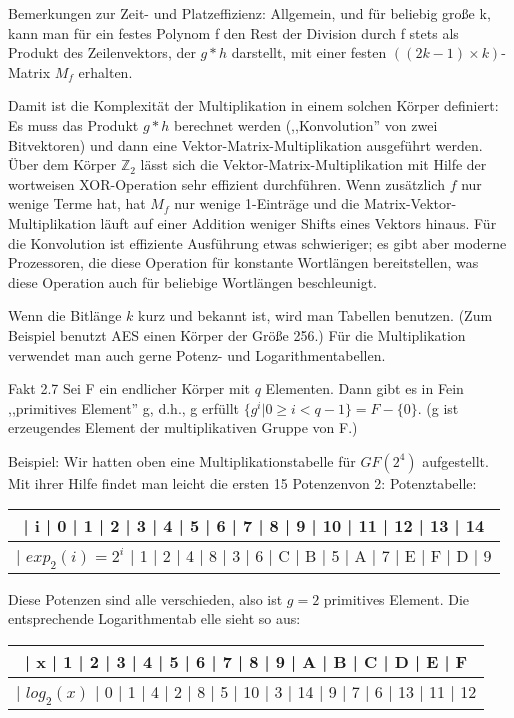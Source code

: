 \documentclass[a4paper]{article}
\begin{document}
\begin{multicols}{3}
    Bemerkungen zur Zeit- und Platzeffizienz: Allgemein, und für beliebig große k, kann man für ein festes Polynom f den Rest der Division durch f stets als Produkt des Zeilenvektors, der $g*h$ darstellt, mit einer festen $((2k-1)\times k)$-Matrix $M_f$ erhalten.

    Damit ist die Komplexität der Multiplikation in einem solchen Körper definiert: Es muss das Produkt $g*h$ berechnet werden (,,Konvolution'' von zwei Bitvektoren) und dann eine Vektor-Matrix-Multiplikation ausgeführt werden. Über dem Körper $\mathbb{Z}_2$ lässt sich die Vektor-Matrix-Multiplikation mit Hilfe der wortweisen XOR-Operation sehr effizient durchführen. Wenn zusätzlich $f$ nur wenige Terme hat, hat $M_f$ nur wenige 1-Einträge und die Matrix-Vektor-Multiplikation läuft auf einer Addition weniger Shifts eines Vektors hinaus. Für die Konvolution ist effiziente Ausführung etwas schwieriger; es gibt aber moderne Prozessoren, die diese Operation für konstante Wortlängen bereitstellen, was diese Operation auch für beliebige Wortlängen beschleunigt.

    Wenn die Bitlänge $k$ kurz und bekannt ist, wird man Tabellen benutzen. (Zum Beispiel benutzt AES einen Körper der Größe 256.) Für die Multiplikation verwendet man auch gerne Potenz- und Logarithmentabellen.

    Fakt 2.7 Sei F ein endlicher Körper mit $q$ Elementen. Dann gibt es in Fein ,,primitives Element'' g, d.h., g erfüllt $\{g^i| 0 \geq i < q-1\}=F-\{0\}$. (g ist erzeugendes Element der multiplikativen Gruppe von F.)

    Beispiel: Wir hatten oben eine Multiplikationstabelle für $GF(2^4)$ aufgestellt. Mit ihrer Hilfe findet man leicht die ersten 15 Potenzenvon 2:
    Potenztabelle:
    \begin{tabular}{c}
        | i       | 0  | 1  | 2  | 3  | 4  | 5  | 6  | 7  | 8  | 9  | 10 | 11 | 12 | 13 | 14 \\\hline
        | $exp_2(i)=2^i$ | 1  | 2  | 4  | 8  | 3  | 6  | C  | B  | 5  | A  | 7  | E  | F  | D  | 9
    \end{tabular}

    Diese Potenzen sind alle verschieden, also ist $g=2$ primitives Element. Die entsprechende Logarithmentab elle sieht so aus:
    \begin{tabular}{c}
        | x     | 1  | 2  | 3  | 4  | 5  | 6  | 7  | 8  | 9  | A  | B  | C  | D  | E  | F \\\hline
        | $log_2(x)$ | 0  | 1  | 4  | 2  | 8  | 5  | 10 | 3  | 14 | 9  | 7  | 6  | 13 | 11 | 12
    \end{tabular}


\end{multicols}
\end{document}

